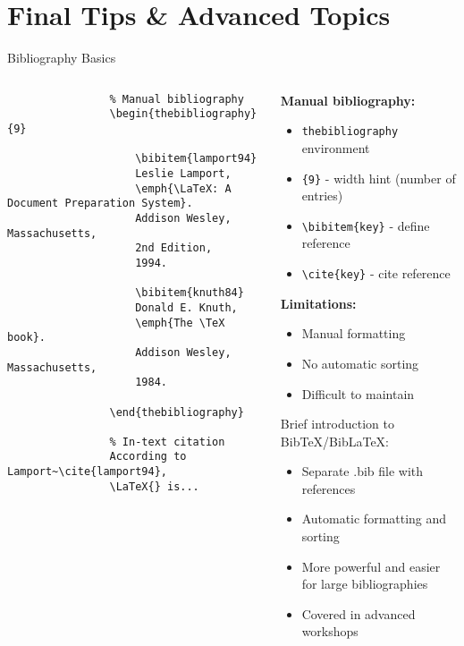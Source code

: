 
\section{Final Tips \& Advanced Topics}

\begin{frame}[fragile]{Bibliography Basics}
	\begin{columns}
		\begin{column}{0.5\textwidth}
			\begin{lstlisting}
				% Manual bibliography
				\begin{thebibliography}{9}
					
					\bibitem{lamport94}
					Leslie Lamport,
					\emph{\LaTeX: A Document Preparation System}.
					Addison Wesley, Massachusetts,
					2nd Edition,
					1994.
					
					\bibitem{knuth84}
					Donald E. Knuth,
					\emph{The \TeX book}.
					Addison Wesley, Massachusetts,
					1984.
					
				\end{thebibliography}
				
				% In-text citation
				According to Lamport~\cite{lamport94},
				\LaTeX{} is...
			\end{lstlisting}
		\end{column}
		
		\begin{column}{0.5\textwidth}
			\textbf{Manual bibliography:}
			\begin{itemize}
				\item \texttt{thebibliography} environment
				\item \texttt{\{9\}} - width hint (number of entries)
				\item \texttt{\textbackslash bibitem\{key\}} - define reference
				\item \texttt{\textbackslash cite\{key\}} - cite reference
			\end{itemize}
			
			\textbf{Limitations:}
			\begin{itemize}
				\item Manual formatting
				\item No automatic sorting
				\item Difficult to maintain
			\end{itemize}
			
			\begin{alertblock}{Brief introduction to BibTeX/BibLaTeX:}
				\begin{itemize}
					\item Separate .bib file with references
					\item Automatic formatting and sorting
					\item More powerful and easier for large bibliographies
					\item Covered in advanced workshops
				\end{itemize}
			\end{alertblock}
		\end{column}
	\end{columns}
\end{frame}

